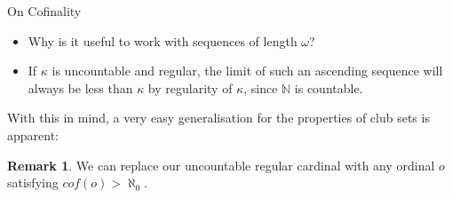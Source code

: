 \documentclass{beamer}
\theoremstyle{definition}
\newtheorem{rem}[subsection]{Remark}
\begin{document}
\begin{frame}{On Cofinality}
    \begin{itemize}
        \item[] Why is it useful to work with sequences of length $\omega$? \pause
        \item[] If $\kappa$ is uncountable and regular, the limit of such an ascending sequence will always be less than $\kappa$ by regularity of $\kappa$, since $\mathbb{N}$ is countable.
    \end{itemize} \pause
    \par With this in mind, a very easy generalisation for the properties of club sets is apparent:
    \begin{rem}
        We can replace our uncountable regular cardinal with any ordinal $o$ satisfying $cof(o)>\aleph_0$.
    \end{rem}
\end{frame}
\end{document}
